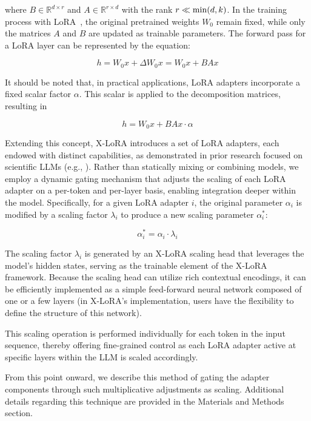 where $B \in \mathbb{R}^{d \times r}$ and $A \in \mathbb{R}^{r \times d}$ with the rank $r \ll {\rm min}(d,k)$. In the training process with LoRA~\cite{hu2021lora}, the original pretrained weights $W_0$ remain fixed, while only the matrices $A$ and $B$ are updated as trainable parameters. The forward pass for a LoRA layer can be represented by the equation:

\begin{equation}
    h = W_0x + \Delta W_0x = W_0x + BAx
\end{equation}

It should be noted that, in practical applications, LoRA adapters incorporate a fixed scalar factor $\alpha$. This scalar is applied to the decomposition matrices, resulting in

\begin{equation}
    h = W_0x + BAx \cdot \alpha
\end{equation}

Extending this concept, X-LoRA introduces a set of LoRA adapters, each endowed with distinct capabilities, as demonstrated in prior research focused on scientific LLMs (e.g., \cite{Buehler2023GenerativeDesign}). Rather than statically mixing or combining models, we employ a dynamic gating mechanism that adjusts the scaling of each LoRA adapter on a per-token and per-layer basis, enabling integration deeper within the model. Specifically, for a given LoRA adapter $i$, the original parameter $\alpha_i$ is modified by a scaling factor $\lambda_i$ to produce a new scaling parameter $\alpha^*_i$:

\begin{equation}
    \alpha^*_i = \alpha_i \cdot \lambda_i
\end{equation}

The scaling factor $\lambda_i$ is generated by an X-LoRA scaling head that leverages the model’s hidden states, serving as the trainable element of the X-LoRA framework. Because the scaling head can utilize rich contextual encodings, it can be efficiently implemented as a simple feed-forward neural network composed of one or a few layers (in X-LoRA’s implementation, users have the flexibility to define the structure of this network).

This scaling operation is performed individually for each token in the input sequence, thereby offering fine-grained control as each LoRA adapter active at specific layers within the LLM is scaled accordingly.

From this point onward, we describe this method of gating the adapter components through such multiplicative adjustments as scaling. Additional details regarding this technique are provided in the Materials and Methods section.

